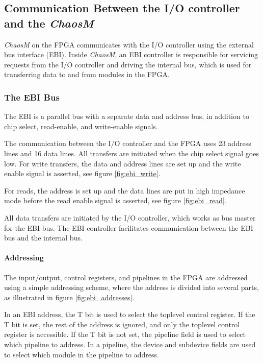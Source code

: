 
\FloatBarrier
\subsection{Communication Between the I/O controller and the \textit{ChaosM}}\label{section:fpga-buses}

\textit{ChaosM} on the FPGA communicates with the I/O controller using the external bus interface
(EBI). Inside \textit{ChaosM}, an EBI controller is responsible
for servicing requests from the I/O controller and driving the internal bus, which
is used for transferring data to and from modules in the FPGA.

\subsubsection{The EBI Bus}
The EBI\cite{efm_ebi} is a parallel bus with a separate data and address bus, in
addition to chip select, read-enable, and write-enable signals.

The communication between the I/O controller and the FPGA uses 23 address lines and 16 data
lines. All transfers are initiated when the chip select signal goes low. For
write transfers, the data and address lines are set up and the write enable
signal is asserted, see figure \ref{fig:ebi_write}.

For reads, the address is set up and the data lines are put in high impedance mode
before the read enable signal is asserted, see figure \ref{fig:ebi_read}.




All data transfers are initiated by the I/O controller, which works as bus
master for the EBI bus. The EBI controller facilitates communication between
the EBI bus and the internal bus.

\FloatBarrier
\paragraph{Addressing}

The input/output, control registers, and pipelines in the FPGA are addressed
using a simple addressing scheme, where the address is divided into several
parts, as illustrated in figure \ref{fig:ebi_addresses}.



In an EBI address, the T bit is used to select the toplevel control register.
If the T bit is set, the rest of the address is ignored, and only the toplevel
control register is accessible. If the T bit is not set, the pipeline field is
used to select which pipeline to address. In a pipeline, the device
and subdevice fields are used to select which module in the pipeline to address.

